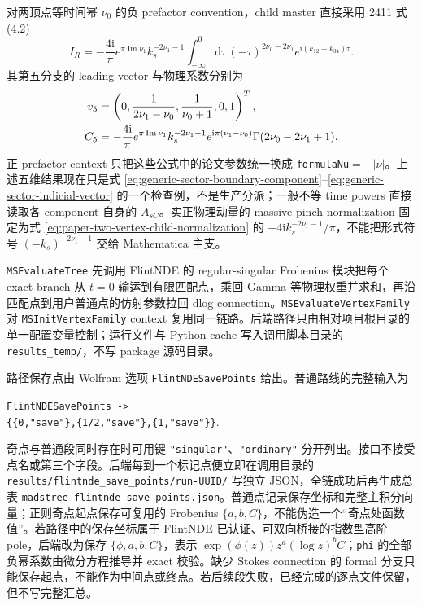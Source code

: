 \documentclass[11pt,a4paper]{ctexart}
\newcommand{\dd}{\mathrm d}
\newcommand{\ii}{\mathrm i}
\begin{document}
对两顶点等时间幂 $\nu_0$ 的负 prefactor convention，child master 直接采用 2411 式 (4.2)
\begin{equation}
 I_R=-\frac{4\ii}{\pi}e^{\pi\operatorname{Im}\nu_1}k_s^{-2\nu_1-1}
 \int_{-\infty}^{0}\dd\tau\,(-\tau)^{2\nu_0-2\nu_1}
 e^{\ii(k_{12}+k_{34})\tau}.
 \label{eq:paper-two-vertex-child-normalization}
\end{equation}
其第五分支的 leading vector 与物理系数分别为
\begin{align}
 v_5&=\left(0,\frac{1}{2\nu_1-\nu_0},\frac{1}{\nu_0+1},0,1\right)^T,
 \notag\\
 C_5&=-\frac{4\ii}{\pi}e^{\pi\operatorname{Im}\nu_1}
 k_s^{-2\nu_1-1}e^{\ii\pi(\nu_1-\nu_0)}
 \Gamma(2\nu_0-2\nu_1+1).
 \label{eq:paper-two-vertex-contact-boundary}
\end{align}
正 prefactor context 只把这些公式中的论文参数统一换成 \texttt{formulaNu}$=-|\nu|$。上述五维结果现在只是式 \eqref{eq:generic-sector-boundary-component}--\eqref{eq:generic-sector-indicial-vector} 的一个检查例，不是生产分派；一般不等 time powers 直接读取各 component 自身的 $A_{sC}$。实正物理动量的 massive pinch normalization 固定为式 \eqref{eq:paper-two-vertex-child-normalization} 的 $-4\ii k_s^{-2\nu_1-1}/\pi$，不能把形式符号 $(-k_s)^{-2\nu_1-1}$ 交给 Mathematica 主支。

\texttt{MSEvaluateTree} 先调用 FlintNDE 的 regular-singular Frobenius 模块把每个 exact branch 从 $t=0$ 输运到有限匹配点，乘回 Gamma 等物理权重并求和，再沿匹配点到用户普通点的仿射参数拉回 dlog connection。\texttt{MSEvaluateVertexFamily} 对 \texttt{MSInitVertexFamily} context 复用同一链路。后端路径只由相对项目根目录的单一配置变量控制；运行文件与 Python cache 写入调用脚本目录的 \texttt{results\_temp/}，不写 package 源码目录。

路径保存点由 Wolfram 选项 \texttt{FlintNDESavePoints} 给出。普通路线的完整输入为
\begin{center}
 \texttt{FlintNDESavePoints ->}\\
 \texttt{\{\{0,"save"\},\{1/2,"save"\},\{1,"save"\}\}}.
\end{center}
奇点与普通段同时存在时可用键 \texttt{"singular"}、\texttt{"ordinary"} 分开列出。接口不接受点名或第三个字段。后端每到一个标记点便立即在调用目录的 \texttt{results/flintnde\_save\_points/run-UUID/} 写独立 JSON，全链成功后再生成总表 \texttt{madstree\_flintnde\_save\_points.json}。普通点记录保存坐标和完整主积分向量；正则奇点起点保存可复用的 Frobenius $\{a,b,C\}$，不能伪造一个“奇点处函数值”。若路径中的保存坐标属于 FlintNDE 已认证、可双向桥接的指数型高阶 pole，后端改为保存
$\{\phi,a,b,C\}$，表示 $\exp(\phi(z))z^a(\log z)^bC$；\texttt{phi} 的全部负幂系数由微分方程推导并 exact 校验。缺少 Stokes connection 的 formal 分支只能保存起点，不能作为中间点或终点。若后续段失败，已经完成的逐点文件保留，但不写完整汇总。
\end{document}
